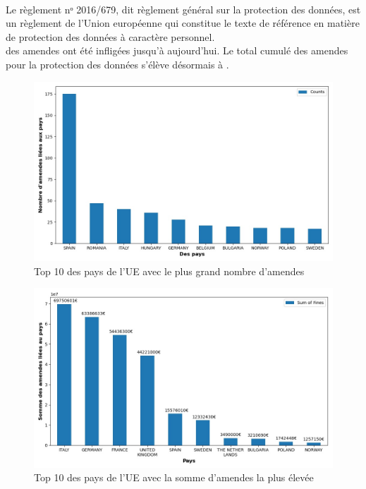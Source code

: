\documentclass[french]{article}
\begin{document}

\noindent\HorRule{3pt} \\[-0.75\baselineskip]
\HorRule{1pt}

\vspace{0.5cm}
	\SepRule
\vspace{0.5cm}


\justify
Le règlement nᵒ 2016/679, dit règlement général sur la protection des données, est un règlement de l'Union européenne qui constitue le texte de référence en matière de protection des données à caractère personnel. \\
\textbf{} des amendes ont été infligées jusqu'à aujourd'hui.
Le total cumulé des amendes pour la protection des données s'élève désormais à \textbf{}.


\begin{figure}
	[H]\centering\includegraphics[width=0.7\linewidth]{graphs/top10_countries}
      \caption{Top 10 des pays de l'UE avec le plus grand nombre d'amendes}
\end{figure}
\begin{figure}
	[H]\centering\includegraphics[width=0.7\linewidth]{graphs/top10_countries_fines}
	\caption{Top 10 des pays de l'UE avec la somme d'amendes la plus élevée}
 \end{figure}
\end{document}
